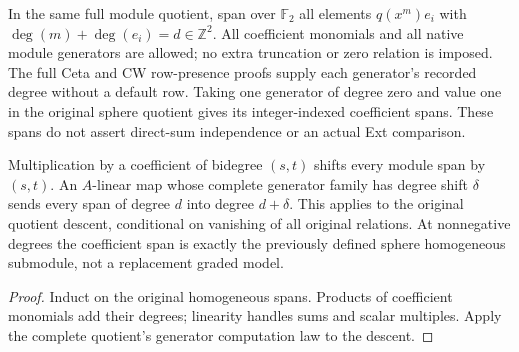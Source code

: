 \begin{definition}
  \label{def:lin-native-homogeneous-spans}
  \leanok
  In the same full module quotient, span over $\mathbb F_2$ all elements
  $q(x^m)e_i$ with $\deg(m)+\deg(e_i)=d\in\mathbb Z^2$.
  All coefficient monomials and all native module generators are allowed;
  no extra truncation or zero relation is imposed. The full Ceta and CW
  row-presence proofs supply each generator's recorded degree without a default row.
  Taking one generator of degree zero and value one in the original sphere
  quotient gives its integer-indexed coefficient spans.
  These spans do not assert direct-sum independence or an actual Ext comparison.
\end{definition}

\begin{proposition}
  \label{prop:lin-native-homogeneous-descent}
  \leanok
  Multiplication by a coefficient of bidegree $(s,t)$ shifts every module
  span by $(s,t)$. An $A$-linear map whose complete generator family has
  degree shift $\delta$ sends every span of degree $d$ into degree $d+\delta$.
  This applies to the original quotient descent, conditional on vanishing
  of all original relations. At nonnegative degrees the coefficient span
  is exactly the previously defined sphere homogeneous submodule, not a
  replacement graded model.
\end{proposition}
\begin{proof}
  \leanok
  Induct on the original homogeneous spans. Products of coefficient
  monomials add their degrees; linearity handles sums and scalar multiples.
  Apply the complete quotient's generator computation law to the descent.
\end{proof}

